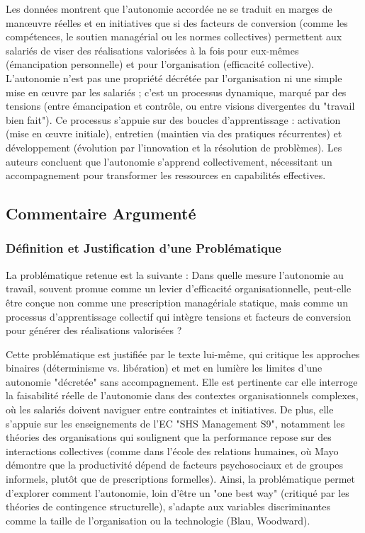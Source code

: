 \documentclass{rapportECL}
\begin{document}
Les données montrent que l’autonomie accordée ne se traduit en marges de manœuvre réelles et en initiatives que si des facteurs de conversion (comme les compétences, le soutien managérial ou les normes collectives) permettent aux salariés de viser des réalisations valorisées à la fois pour eux-mêmes (émancipation personnelle) et pour l’organisation (efficacité collective). L’autonomie n’est pas une propriété décrétée par l’organisation ni une simple mise en œuvre par les salariés ; c’est un processus dynamique, marqué par des tensions (entre émancipation et contrôle, ou entre visions divergentes du "travail bien fait"). Ce processus s’appuie sur des boucles d’apprentissage : activation (mise en œuvre initiale), entretien (maintien via des pratiques récurrentes) et développement (évolution par l’innovation et la résolution de problèmes). Les auteurs concluent que l’autonomie s’apprend collectivement, nécessitant un accompagnement pour transformer les ressources en capabilités effectives.

\subsection{Commentaire Argumenté}

\subsubsection{Définition et Justification d’une Problématique}
La problématique retenue est la suivante : Dans quelle mesure l’autonomie au travail, souvent promue comme un levier d’efficacité organisationnelle, peut-elle être conçue non comme une prescription managériale statique, mais comme un processus d’apprentissage collectif qui intègre tensions et facteurs de conversion pour générer des réalisations valorisées ?

Cette problématique est justifiée par le texte lui-même, qui critique les approches binaires (déterminisme vs. libération) et met en lumière les limites d’une autonomie "décretée" sans accompagnement. Elle est pertinente car elle interroge la faisabilité réelle de l’autonomie dans des contextes organisationnels complexes, où les salariés doivent naviguer entre contraintes et initiatives. De plus, elle s’appuie sur les enseignements de l’EC "SHS Management S9", notamment les théories des organisations qui soulignent que la performance repose sur des interactions collectives (comme dans l’école des relations humaines, où Mayo démontre que la productivité dépend de facteurs psychosociaux et de groupes informels, plutôt que de prescriptions formelles). Ainsi, la problématique permet d’explorer comment l’autonomie, loin d’être un "one best way" (critiqué par les théories de contingence structurelle), s’adapte aux variables discriminantes comme la taille de l’organisation ou la technologie (Blau, Woodward).
\end{document}
